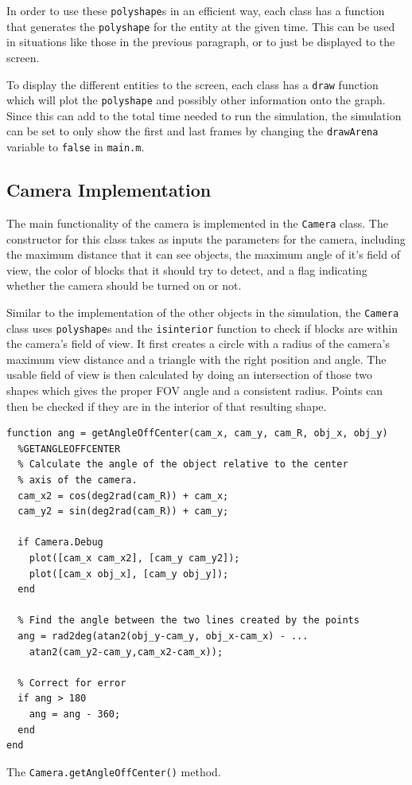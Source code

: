 \documentclass[12pt]{article}
\begin{document}
In order to use these \texttt{polyshape}s in an efficient way, each class has a function that generates the \texttt{polyshape} for the entity at the given time. This can be used in situations like those in the previous paragraph, or to just be displayed to the screen.

To display the different entities to the screen, each class has a \texttt{draw} function which will plot the \texttt{polyshape} and possibly other information onto the graph. Since this can add to the total time needed to run the simulation, the simulation can be set to only show the first and last frames by changing the \texttt{drawArena} variable to \texttt{false} in \texttt{main.m}.

\subsection{Camera Implementation}
The main functionality of the camera is implemented in the \texttt{Camera} class. The constructor for this class takes as inputs the parameters for the camera, including the maximum distance that it can see objects, the maximum angle of it's field of view, the color of blocks that it should try to detect, and a flag indicating whether the camera should be turned on or not. 

Similar to the implementation of the other objects in the simulation, the \texttt{Camera} class uses \texttt{polyshape}s and the \texttt{isinterior} function to check if blocks are within the camera's field of view. It first creates a circle with a radius of the camera's maximum view distance and a triangle with the right position and angle. The usable field of view is then calculated by doing an intersection of those two shapes which gives the proper FOV angle and a consistent radius. Points can then be checked if they are in the interior of that resulting shape.

\begin{listing}[ht]
\begin{verbatim}
function ang = getAngleOffCenter(cam_x, cam_y, cam_R, obj_x, obj_y)
  %GETANGLEOFFCENTER
  % Calculate the angle of the object relative to the center
  % axis of the camera.
  cam_x2 = cos(deg2rad(cam_R)) + cam_x;
  cam_y2 = sin(deg2rad(cam_R)) + cam_y;
  
  if Camera.Debug
    plot([cam_x cam_x2], [cam_y cam_y2]);
    plot([cam_x obj_x], [cam_y obj_y]);
  end
  
  % Find the angle between the two lines created by the points
  ang = rad2deg(atan2(obj_y-cam_y, obj_x-cam_x) - ...
    atan2(cam_y2-cam_y,cam_x2-cam_x));
  
  % Correct for error
  if ang > 180
    ang = ang - 360;
  end
end
\end{verbatim}
\caption{The \texttt{Camera.getAngleOffCenter()} method.}
\label{lst:getAngleOffCenter}
\end{listing}
\end{document}
